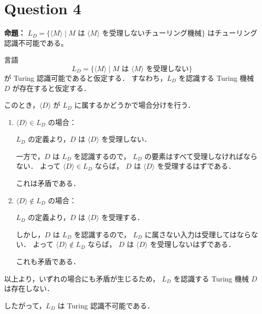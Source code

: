 \documentclass[uplatex,a4paper,11pt]{jsarticle}
\begin{document}
\section*{Question 4}

\noindent\textbf{命題：}
$L_D = \{\langle M \rangle \mid M \text{ は } \langle M \rangle \text{ を受理しないチューリング機械}\}$
はチューリング認識不可能である。

\noindent
言語
\[
L_D = \{ \langle M \rangle \mid M \text{ は } \langle M \rangle \text{ を受理しない} \}
\]
が Turing 認識可能であると仮定する．
すなわち，$L_D$ を認識する Turing 機械 $D$ が存在すると仮定する．

このとき，$\langle D \rangle$ が $L_D$ に属するかどうかで場合分けを行う．

\begin{enumerate}
  \item $\langle D \rangle \in L_D$ の場合：

  $L_D$ の定義より，$D$ は $\langle D \rangle$ を受理しない．

  一方で，$D$ は $L_D$ を認識するので，
  $L_D$ の要素はすべて受理しなければならない．
  よって $\langle D \rangle \in L_D$ ならば，
  $D$ は $\langle D \rangle$ を受理するはずである．

  これは矛盾である．

  \item $\langle D \rangle \notin L_D$ の場合：

  $L_D$ の定義より，$D$ は $\langle D \rangle$ を受理する．

  しかし，$D$ は $L_D$ を認識するので，
  $L_D$ に属さない入力は受理してはならない．
  よって $\langle D \rangle \notin L_D$ ならば，
  $D$ は $\langle D \rangle$ を受理しないはずである．

  これも矛盾である．
\end{enumerate}

以上より，いずれの場合にも矛盾が生じるため，
$L_D$ を認識する Turing 機械 $D$ は存在しない．

したがって，$L_D$ は Turing 認識不可能である．
\end{document}

